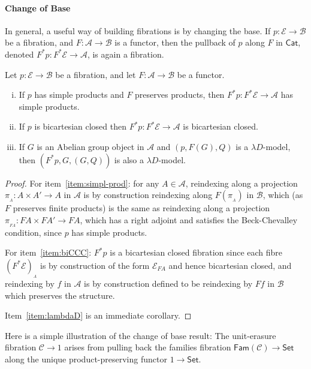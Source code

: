 \documentclass[a4paper,UKenglish]{lipics}
\newcommand{\ra}{\rightarrow}
\newcommand{\msf}[1]{\mathsf{#1}} %
\newcommand{\Set}{\msf{Set}}
\newcommand{\Cat}{\msf{Cat}}
\newcommand{\Fam}[1]{\msf{Fam}(#1)}
\newcommand{\A}{\mathcal{A}}
\newcommand{\B}{\mathcal{B}}
\newcommand{\C}{\mathcal{C}}
\newcommand{\E}{\mathcal{E}}
\newcommand{\fibre}[2]{#1_{_{#2}}}
\newcommand{\fibreE}[1]{\E_{#1}}
\begin{document}
\paragraph*{Change of Base}
\label{sec:change-of-base}
In general, a useful way of building fibrations is by changing the base.
If $p:\E\ra \B$ be a fibration,
and $F:\A\ra \B$ is a functor,
then the pullback of $p$ along $F$ in $\Cat$,
denoted
$F^\ast p : F^\ast \E \rightarrow \A$,
is again a fibration.
\begin{theorem}
\label{thm:change-of-base}
Let $p:\E\ra \B$ be a fibration,
and let $F:\A\ra \B$ be a functor.
\begin{enumerate}[(i)]
\item If $p$ has simple products and $F$ preserves products,
then $F^\ast p : F^\ast \E \rightarrow \A$ has simple products.
\label{item:simpl-prod}
\item If $p$ is bicartesian closed then $F^\ast p: F^\ast \E \rightarrow \A$
is bicartesian closed.
\label{item:biCCC}
\item If $G$ is an Abelian group object in $\A$ and
  $(p,F(G),Q)$ is a $\lambda D$-model,
  then $(F^\ast p,G,(G, Q))$ is also a $\lambda D$-model.
\label{item:lambdaD}
\end{enumerate}
\end{theorem}
\begin{proof}
For item~\eqref{item:simpl-prod}: for any $A \in \A$, reindexing along a projection $\pi_{_{A}}: A \times A' \rightarrow A$ in $\A$ is by construction reindexing along $F(\pi_{_{A}})$ in $\B$, which (as $F$ preserves finite products) is the same as reindexing along a projection $\pi_{_{FA}} : FA \times FA' \rightarrow FA$, which has a right adjoint and satisfies the Beck-Chevalley condition, since $p$ has simple products.

For item~\eqref{item:biCCC}: $F^*p$ is a bicartesian closed fibration since each fibre $\fibre{(F^*\E)}{A}$ is by construction of the form $\fibreE{FA}$ and hence bicartesian closed, and reindexing by $f$ in $\A$ is by construction defined to be reindexing by $Ff$ in $\B$ which preserves the structure.

Item~\eqref{item:lambdaD} is an immediate corollary.
\end{proof}


Here is a simple illustration of the change of base result:
The unit-erasure fibration $\C\to 1$ arises from pulling back the families fibration
$\Fam\C\to\Set$ along the unique product-preserving functor $1\to\Set$.
\end{document}
